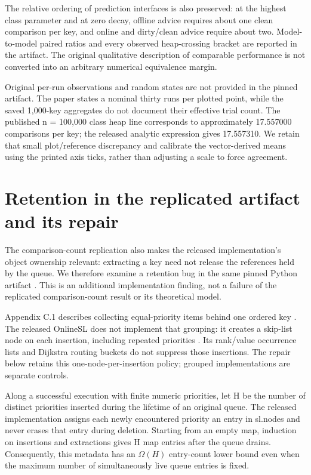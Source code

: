 The relative ordering of prediction interfaces is also preserved: at the highest class parameter and at zero decay, offline advice requires about one clean comparison per key, and online and dirty/clean advice require about two. Model-to-model paired ratios and every observed heap-crossing bracket are reported in the artifact. The original qualitative description of comparable performance is not converted into an arbitrary numerical equivalence margin.

Original per-run observations and random states are not provided in the pinned artifact. The paper states a nominal thirty runs per plotted point, while the saved 1,000-key aggregates do not document their effective trial count. The published n = 100,000 class heap line corresponds to approximately 17.557000 comparisons per key; the released analytic expression gives 17.557310. We retain that small plot/reference discrepancy and calibrate the vector-derived means using the printed axis ticks, rather than adjusting a scale to force agreement.

\section{Retention in the replicated artifact and its repair}
The comparison-count replication also makes the released implementation's object ownership relevant: extracting a key need not release the references held by the queue. We therefore examine a retention bug in the same pinned Python artifact \cite{ref2}. This is an additional implementation finding, not a failure of the replicated comparison-count result or its theoretical model.

Appendix C.1 describes collecting equal-priority items behind one ordered key \cite{ref1}. The released OnlineSL does not implement that grouping: it creates a skip-list node on each insertion, including repeated priorities \cite{ref2}. Its rank/value occurrence lists and Dijkstra routing buckets do not suppress those insertions. The repair below retains this one-node-per-insertion policy; grouped implementations are separate controls.

Along a successful execution with finite numeric priorities, let H be the number of distinct priorities inserted during the lifetime of an original queue. The released implementation assigns each newly encountered priority an entry in sl.nodes and never erases that entry during deletion. Starting from an empty map, induction on insertions and extractions gives H map entries after the queue drains. Consequently, this metadata has an \(\Omega(H)\) entry-count lower bound even when the maximum number of simultaneously live queue entries is fixed. 

